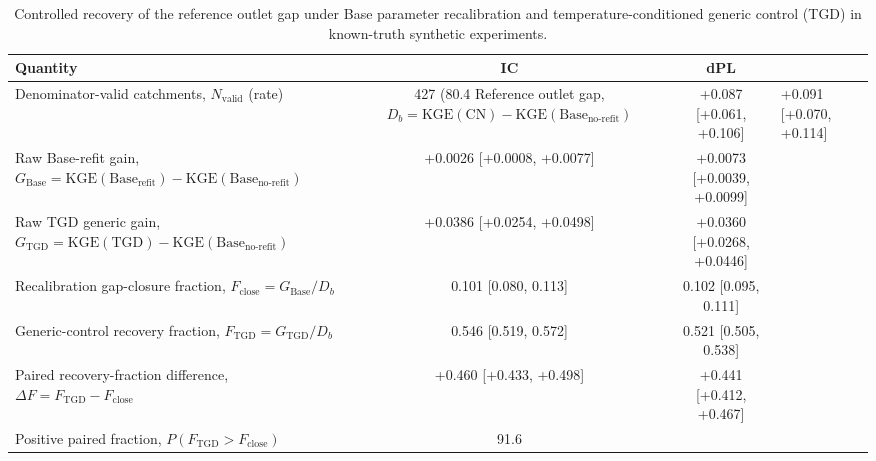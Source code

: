 \begin{table}[t]
\centering
\small
\begin{threeparttable}
\caption{Controlled recovery of the reference outlet gap under Base parameter recalibration and temperature-conditioned generic control (TGD) in known-truth synthetic experiments.}
\label{tab:controlled_recovery}
\begin{tabular}{lcc}
\toprule
Quantity & IC & dPL \\
\midrule
Denominator-valid catchments, $N_{\mathrm{valid}}$ (rate) & 427 (80.4%
Reference outlet gap, $D_b = \mathrm{KGE}(\mathrm{CN}) - \mathrm{KGE}(\mathrm{Base}_{\mathrm{no\text{-}refit}})$ & +0.087 [+0.061, +0.106] & +0.091 [+0.070, +0.114] \\
Raw Base-refit gain, $G_{\mathrm{Base}} = \mathrm{KGE}(\mathrm{Base}_{\mathrm{refit}}) - \mathrm{KGE}(\mathrm{Base}_{\mathrm{no\text{-}refit}})$ & +0.0026 [+0.0008, +0.0077] & +0.0073 [+0.0039, +0.0099] \\
Raw TGD generic gain, $G_{\mathrm{TGD}} = \mathrm{KGE}(\mathrm{TGD}) - \mathrm{KGE}(\mathrm{Base}_{\mathrm{no\text{-}refit}})$ & +0.0386 [+0.0254, +0.0498] & +0.0360 [+0.0268, +0.0446] \\
Recalibration gap-closure fraction, $F_{\mathrm{close}} = G_{\mathrm{Base}} / D_b$ & 0.101 [0.080, 0.113] & 0.102 [0.095, 0.111] \\
Generic-control recovery fraction, $F_{\mathrm{TGD}} = G_{\mathrm{TGD}} / D_b$ & 0.546 [0.519, 0.572] & 0.521 [0.505, 0.538] \\
Paired recovery-fraction difference, $\Delta F = F_{\mathrm{TGD}} - F_{\mathrm{close}}$ & +0.460 [+0.433, +0.498] & +0.441 [+0.412, +0.467] \\
Positive paired fraction, $P(F_{\mathrm{TGD}} > F_{\mathrm{close}})$ & 91.6%
\bottomrule
\end{tabular}
\begin{tablenotes}[flushleft]
\footnotesize

\end{tablenotes}
\end{threeparttable}
\end{table}
